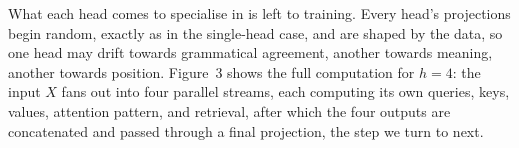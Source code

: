 \documentclass[11pt]{article}
\begin{document}
What each head comes to specialise in is left to training. Every head's projections begin random, exactly as in the single-head case, and are shaped by the data, so one head may drift towards grammatical agreement, another towards meaning, another towards position. Figure~3 shows the full computation for $h = 4$: the input $X$ fans out into four parallel streams, each computing its own queries, keys, values, attention pattern, and retrieval, after which the four outputs are concatenated and passed through a final projection, the step we turn to next.



\end{document}
